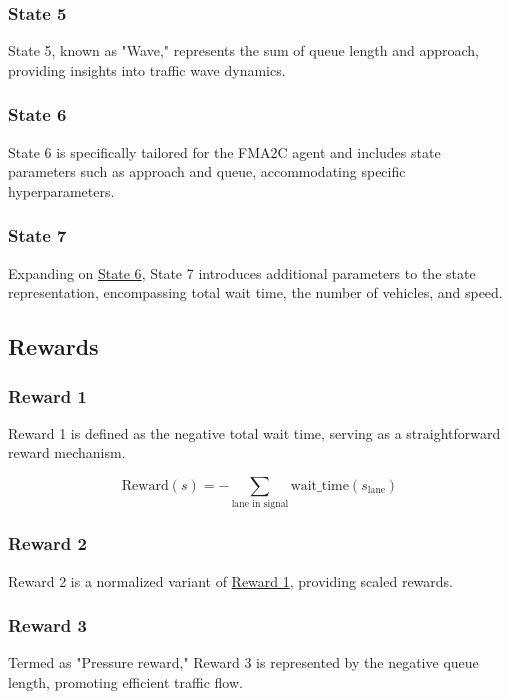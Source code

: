 \subsubsection{State 5} \label{subsec:state-5}
State 5, known as "Wave," represents the sum of queue length and approach, providing insights into traffic wave dynamics.

\subsubsection{State 6} \label{subsec:state-6}
State 6 is specifically tailored for the FMA2C agent and includes state parameters such as approach and queue, accommodating specific hyperparameters.

\subsubsection{State 7} \label{subsec:state-7}
Expanding on \hyperref[subsec:state-6]{State 6}, State 7 introduces additional parameters to the state representation, encompassing total wait time, the number of vehicles, and speed.

\subsection{Rewards}
\subsubsection{Reward 1} \label{subsec:reward-1}
Reward 1 is defined as the negative total wait time, serving as a straightforward reward mechanism.

\begin{equation}
    \text{Reward}(s) = -\sum_{\text{lane in signal}} \text{wait\_time}(s_{\text{lane}})
\end{equation}

\subsubsection{Reward 2} \label{subsec:reward-2}
Reward 2 is a normalized variant of \hyperref[subsec:reward-1]{Reward 1}, providing scaled rewards.

\subsubsection{Reward 3} \label{subsec:reward-3}
Termed as "Pressure reward," Reward 3 is represented by the negative queue length, promoting efficient traffic flow.

